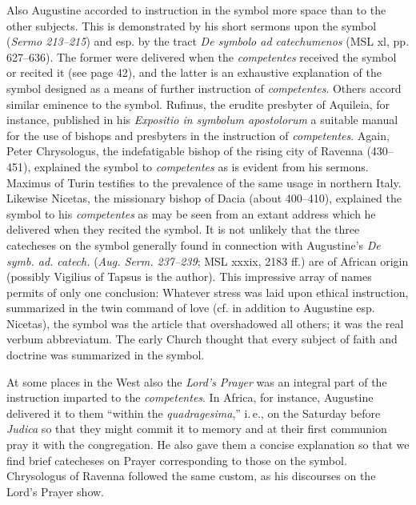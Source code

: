 Also Augustine accorded to instruction in the symbol more space than to the other subjects. This is demonstrated by his short sermons upon the symbol (\emph{Sermo 213–215}) and esp. by the tract \emph{De symbolo ad catechumenos} (MSL xl, pp. 627–636). The former were delivered when the \emph{competentes} received the symbol or recited it (see page 42), and the latter is an exhaustive explanation of the symbol designed as a means of further instruction of \emph{competentes}. Others accord similar eminence to the symbol. Rufinus, the erudite presbyter of Aquileia, for instance, published in his \emph{Expositio in symbolum apostolorum} a suitable manual for the use of bishops and presbyters in the instruction of \emph{competentes}. Again, Peter Chrysologus, the indefatigable bishop of the rising city of Ravenna (430–451), explained the symbol to \emph{competentes} as is evident from his sermons. Maximus of Turin testifies to the prevalence of the same usage in northern Italy. Likewise Nicetas, the missionary bishop of Dacia
(about 400–410), explained the symbol to his \emph{competentes} as may be seen from an extant address which he delivered when they recited the symbol. It is not unlikely that the three catecheses on the symbol generally found in connection with Augustine’s \emph{De symb. ad. catech.} (\emph{Aug. Serm. 237–239}; MSL xxxix, 2183 ff.) are of African origin (possibly Vigilius of Tapsus is the author). This impressive array of names permits of only one conclusion: Whatever stress was laid upon ethical instruction, summarized in the twin command of love (cf. in addition to Augustine esp. Nicetas), the symbol was the article that overshadowed all others; it was the real verbum abbreviatum. The early Church thought that every subject of faith and doctrine was summarized in the symbol.

At some places in the West also the \emph{Lord’s Prayer} was an integral part of the instruction imparted to the \emph{competentes}. In Africa, for instance, Augustine delivered it to them “within the \emph{quadragesima},” i.\,e., on the Saturday before \emph{Judica} so that they might commit it to memory and at their first communion pray it with the congregation. He also gave them a concise explanation so that we find brief catecheses on Prayer corresponding to those on the symbol. Chrysologus of Ravenna followed the same custom, as his discourses on the Lord’s Prayer show.

